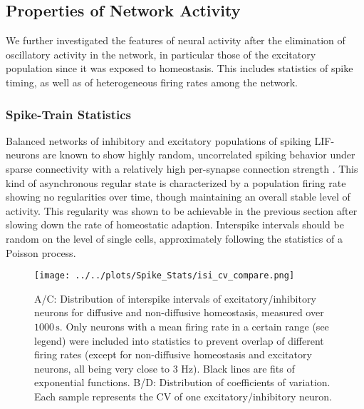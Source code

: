 \documentclass[10pt,a4paper]{article}
\begin{document}
\subsection{Properties of Network Activity}

We further investigated the features of neural activity after the elimination of oscillatory activity in the network, in particular those of the excitatory population since it was exposed to homeostasis. This includes statistics of spike timing, as well as of heterogeneous firing rates among the network.  

\subsubsection{Spike-Train Statistics}
Balanced networks of inhibitory and excitatory populations of spiking LIF-neurons are known to show highly random, uncorrelated spiking behavior under sparse connectivity with a relatively high per-synapse connection strength \cite{Vreeswijk1996,Brunel2000}. This kind of asynchronous regular state is characterized by a population firing rate showing no regularities over time, though maintaining an overall stable level of activity. This regularity was shown to be achievable in the previous section after slowing down the rate of homeostatic adaption. Interspike intervals should be random on the level of single cells, approximately following the statistics of a Poisson process.   
\begin{figure}
\texttt{[image: ../../plots/Spike\_Stats/isi\_cv\_compare.png]}
\caption{A/C: Distribution of interspike intervals of excitatory/inhibitory neurons for diffusive and non-diffusive homeostasis, measured over $\mathrm{1000\,s}$. Only neurons with a mean firing rate in a certain range (see legend) were included into statistics to prevent overlap of different firing rates (except for non-diffusive homeostasis and excitatory neurons, all being very close to 3 Hz). Black lines are fits of exponential functions. B/D: Distribution of coefficients of variation. Each sample represents the CV of one excitatory/inhibitory neuron.}
\label{ISI_CV_compare}
\end{figure}
\end{document}
